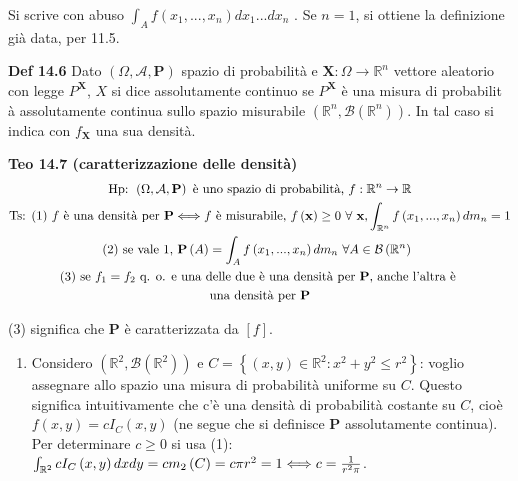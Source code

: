 \documentclass{article}
\begin{document}
Si scrive con abuso $\int_{A}f\left( x_{1},...,x_{n}\right) dx_{1}...dx_{n}$%
. Se $n=1$, si ottiene la definizione gi\`{a} data, per 11.5.

\textbf{Def 14.6} Dato $\left( \Omega ,\mathcal{A},\mathbf{P}\right) $
spazio di probabilit\`{a} e $\mathbf{X}:\Omega \rightarrow 
\mathbb{R}
^{n}$ vettore aleatorio con legge $P^{\mathbf{X}}$, $X$ si dice
assolutamente continuo se $P^{\mathbf{X}}$ \`{e} una misura di probabilit%
\`{a} assolutamente continua sullo spazio misurabile $\left( 
\mathbb{R}
^{n},\mathcal{B}\left( 
\mathbb{R}
^{n}\right) \right) $. In tal caso si indica con $f_{\mathbf{X}}$ una sua
densit\`{a}.

\textbf{Teo 14.7 (caratterizzazione delle densit\`{a})}%
\begin{gather*}
\text{Hp: }\left( \Omega ,\mathcal{A},\mathbf{P}\right) \text{ \`{e} uno
spazio di probabilit\`{a}, }f:%
\mathbb{R}
^{n}\rightarrow 
\mathbb{R}
\\
\text{Ts: (1) }f\text{ \`{e} una densit\`{a} per }\mathbf{P}%
\Longleftrightarrow f\text{ \`{e} misurabile, }f\left( \mathbf{x}\right)
\geq 0\text{ }\forall \text{ }\mathbf{x}\text{,}\int_{%
\mathbb{R}
^{n}}f\left( x_{1},...,x_{n}\right) dm_{n}=1 \\
\text{(2) se vale }1\text{, }\mathbf{P}\left( A\right) =\int_{A}f\left(
x_{1},...,x_{n}\right) dm_{n}\text{ }\forall A\in \mathcal{B}\left( 
\mathbb{R}
^{n}\right) \text{ } \\
\text{(3) se }f_{1}=f_{2}\text{ q. o. e una delle due \`{e} una densit\`{a}
per }\mathbf{P}\text{, anche l'altra \`{e} } \\
\text{una densit\`{a} per }\mathbf{P}
\end{gather*}

(3) significa che $\mathbf{P}$ \`{e} caratterizzata da $\left[ f\right] $.

\begin{enumerate}
\item Considero $\left( 
\mathbb{R}
^{2},\mathcal{B}\left( 
\mathbb{R}
^{2}\right) \right) $ e $C=\left\{ \left( x,y\right) \in 
\mathbb{R}
^{2}:x^{2}+y^{2}\leq r^{2}\right\} $: voglio assegnare allo spazio una
misura di probabilit\`{a} uniforme su $C$. Questo significa intuitivamente
che c'\`{e} una densit\`{a} di probabilit\`{a} costante su $C$, cio\`{e} $%
f\left( x,y\right) =cI_{C}\left( x,y\right) $ (ne segue che si definisce $%
\mathbf{P}$ assolutamente continua). Per determinare $c\geq 0$ si usa (1): $%
\int_{%
\mathbb{R}
^{2}}cI_{C}\left( x,y\right) dxdy=cm_{2}\left( C\right) =c\pi
r^{2}=1\Longleftrightarrow c=\frac{1}{r^{2}\pi }$.
\end{enumerate}
\end{document}

